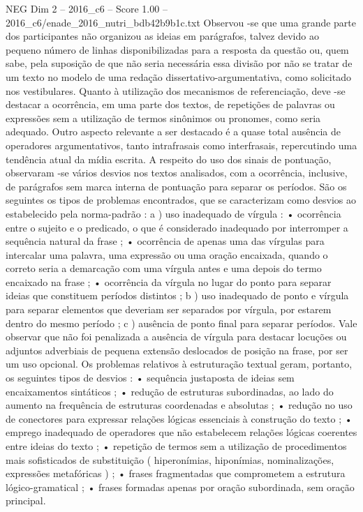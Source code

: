 \begin{textsample}{NEG Dim 2 – 2016\_c6 – Score 1.00 – 2016\_c6/enade\_2016\_nutri\_bdb42b9b1c.txt}
Observou -se que uma grande parte dos participantes não organizou as ideias em parágrafos, talvez devido ao pequeno número de linhas disponibilizadas para a resposta da questão ou, quem sabe, pela suposição de que não seria necessária essa divisão por não se tratar de um texto no modelo de uma redação dissertativo-argumentativa, como solicitado nos vestibulares.
Quanto à utilização dos mecanismos de referenciação, deve -se destacar a ocorrência, em uma parte dos textos, de repetições de palavras ou expressões sem a utilização de termos sinônimos ou pronomes, como seria adequado.
Outro aspecto relevante a ser destacado é a quase total ausência de operadores argumentativos, tanto intrafrasais como interfrasais, repercutindo uma tendência atual da mídia escrita.
A respeito do uso dos sinais de pontuação, observaram -se vários desvios nos textos analisados, com a ocorrência, inclusive, de parágrafos sem marca interna de pontuação para separar os períodos.
São os seguintes os tipos de problemas encontrados, que se caracterizam como desvios ao estabelecido pela norma-padrão : a ) uso inadequado de vírgula : • ocorrência entre o sujeito e o predicado, o que é considerado inadequado por interromper a sequência natural da frase ; • ocorrência de apenas uma das vírgulas para intercalar uma palavra, uma expressão ou uma oração encaixada, quando o correto seria a demarcação com uma vírgula antes e uma depois do termo encaixado na frase ; • ocorrência da vírgula no lugar do ponto para separar ideias que constituem períodos distintos ; b ) uso inadequado de ponto e vírgula para separar elementos que deveriam ser separados por vírgula, por estarem dentro do mesmo período ; c ) ausência de ponto final para separar períodos.
Vale observar que não foi penalizada a ausência de vírgula para destacar locuções ou adjuntos adverbiais de pequena extensão deslocados de posição na frase, por ser um uso opcional.
Os problemas relativos à estruturação textual geram, portanto, os seguintes tipos de desvios : • sequência justaposta de ideias sem encaixamentos sintáticos ; • redução de estruturas subordinadas, ao lado do aumento na frequência de estruturas coordenadas e absolutas ; • redução no uso de conectores para expressar relações lógicas essenciais à construção do texto ; • emprego inadequado de operadores que não estabelecem relações lógicas coerentes entre ideias do texto ; • repetição de termos sem a utilização de procedimentos mais sofisticados de substituição ( hiperonímias, hiponímias, nominalizações, expressões metafóricas ) ; • frases fragmentadas que comprometem a estrutura lógico-gramatical ; • frases formadas apenas por oração subordinada, sem oração principal.

\end{textsample}
